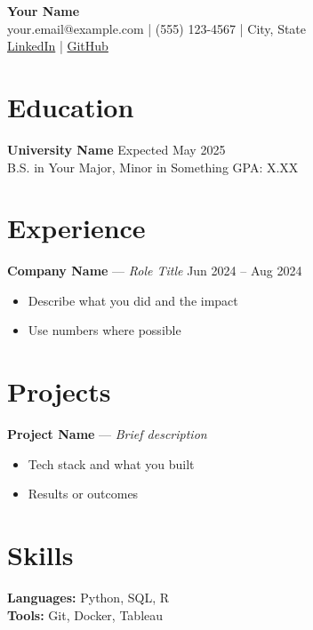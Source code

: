 \documentclass[11pt,a4paper]{article}
\begin{document}
\begin{center}
{\LARGE \textbf{Your Name}} \\[4pt]
your.email@example.com \quad | \quad (555) 123-4567 \quad | \quad City, State \\
\href{https://linkedin.com/in/yourprofile}{LinkedIn} \quad | \quad \href{https://github.com/youruser}{GitHub}
\end{center}

\section*{Education}
\textbf{University Name} \hfill Expected May 2025 \\
B.S. in Your Major, Minor in Something \hfill GPA: X.XX

\section*{Experience}
\textbf{Company Name} — \textit{Role Title} \hfill Jun 2024 -- Aug 2024
\begin{itemize}[nosep]
  \item Describe what you did and the impact
  \item Use numbers where possible
\end{itemize}

\section*{Projects}
\textbf{Project Name} — \textit{Brief description}
\begin{itemize}[nosep]
  \item Tech stack and what you built
  \item Results or outcomes
\end{itemize}

\section*{Skills}
\textbf{Languages:} Python, SQL, R \\
\textbf{Tools:} Git, Docker, Tableau
\end{document}
